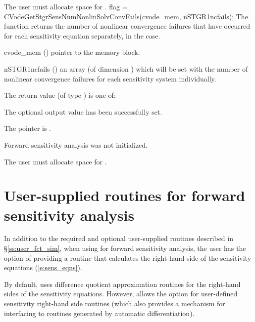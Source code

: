 {
  {\warn}The user must allocate space for .
}
{
  flag = CVodeGetStgrSensNumNonlinSolvConvFails(cvode\_mem, nSTGR1ncfails);
}
{
  The function  returns the
  number of nonlinear convergence failures that have occurred for
  each sensitivity equation separately, in the  case.
}
{
  \begin{args}
  \item[cvode\_mem] ()
    pointer to the {\cvodes} memory block.
  \item[nSTGR1ncfails] ()
    an array (of dimension ) which will be set with the
    number of nonlinear convergence failures for each sensitivity system individually.
  \end{args}
}
{
  The return value  (of type ) is one of:
  \begin{args}
  \item[\Id{CV\_SUCCESS}] 
    The optional output value has been successfully set.
  \item[\Id{CV\_MEM\_NULL}]
    The  pointer is .
  \item[\Id{CV\_NO\_SENS}]
    Forward sensitivity analysis was not initialized.
  \end{args}
}
{
  {\warn}The user must allocate space for .
}
\section{User-supplied routines for forward sensitivity analysis}
\label{s:user_fct_fwd}

In addition to the required and optional user-supplied routines described
in \S\ref{ss:user_fct_sim}, when using {\cvodes} for forward sensitivity analysis,
the user has the option of providing a routine that calculates the right-hand side 
of the sensitivity equations (\ref{e:sens_eqns}).

By default, {\cvodes} uses difference quotient approximation routines for the right-hand
sides of the sensitivity equations.
However, {\cvodes} allows the option for user-defined sensitivity right-hand side routines
(which also provides a mechanism for interfacing {\cvodes} to routines
generated by automatic differentiation).

